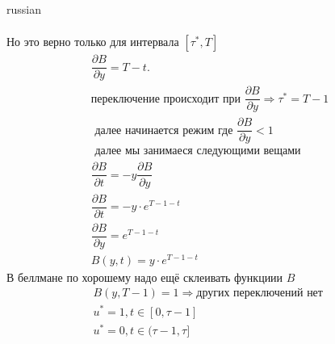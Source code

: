 \documentclass{article}
\begin{document}
\begin{otherlanguage*}{russian}
\begin{enumerate}
\begin{itemize}
\begin{align*}
\end{align*}
Но это верно только для интервала $ [\tau^*, T] $  
\begin{align*}
\dfrac{\partial B}{\partial y} = T - t. \\
\text{переключение происходит при } \dfrac{\partial B}{\partial y} \Rightarrow \tau ^* = T - 1 \\
\text{ далее начинается режим где  } \dfrac{\partial B}{\partial y} < 1 \\
\text{ далее мы занимаеся следующими вещами } \\
\dfrac{\partial B}{\partial t} = - y \dfrac{\partial B}{\partial y} \\
\dfrac{\partial B}{\partial t} = - y \cdot e ^{T - 1 - t } \\
\dfrac{\partial B}{\partial y} = e^{T - 1 - t} \\
B(y, t) = y \cdot e^{T - 1 - t} 
\end{align*}
В беллмане по хорошему надо ещё склеивать функциии $ B $ 
\begin{align*}
B(y, T - 1) = 1 \Rightarrow \text{других переключений нет } \\
u^* = 1, t \in [0, \tau - 1] \\
u^* = 0, t \in (\tau - 1 , \tau] 
\end{align*}
\end{itemize}
\end{enumerate}
\end{otherlanguage*}
\end{document}
